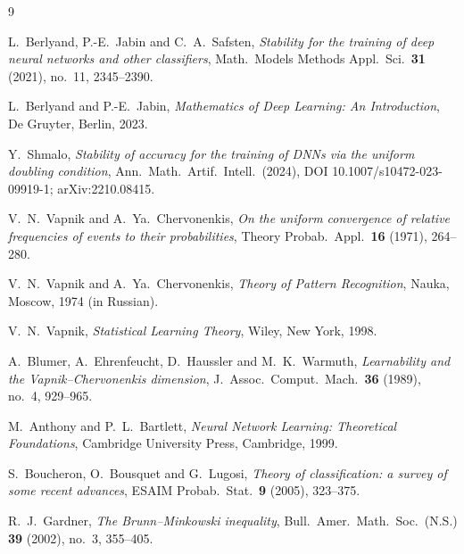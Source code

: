 \documentclass[11pt]{article}
\begin{document}
\begin{thebibliography}{9}

L.~Berlyand, P.-E.~Jabin and C.~A.~Safsten,
\emph{Stability for the training of deep neural networks and other classifiers},
Math.\ Models Methods Appl.\ Sci.\ \textbf{31} (2021), no.~11, 2345--2390.

L.~Berlyand and P.-E.~Jabin,
\emph{Mathematics of Deep Learning: An Introduction},
De Gruyter, Berlin, 2023.

Y.~Shmalo,
\emph{Stability of accuracy for the training of DNNs via the uniform doubling
condition},
Ann.\ Math.\ Artif.\ Intell.\ (2024), DOI 10.1007/s10472-023-09919-1;
arXiv:2210.08415.

V.~N.~Vapnik and A.~Ya.~Chervonenkis,
\emph{On the uniform convergence of relative frequencies of events to their
probabilities},
Theory Probab.\ Appl.\ \textbf{16} (1971), 264--280.

V.~N.~Vapnik and A.~Ya.~Chervonenkis,
\emph{Theory of Pattern Recognition},
Nauka, Moscow, 1974 (in Russian).

V.~N.~Vapnik,
\emph{Statistical Learning Theory},
Wiley, New York, 1998.

A.~Blumer, A.~Ehrenfeucht, D.~Haussler and M.~K.~Warmuth,
\emph{Learnability and the Vapnik--Chervonenkis dimension},
J.\ Assoc.\ Comput.\ Mach.\ \textbf{36} (1989), no.~4, 929--965.

M.~Anthony and P.~L.~Bartlett,
\emph{Neural Network Learning: Theoretical Foundations},
Cambridge University Press, Cambridge, 1999.

S.~Boucheron, O.~Bousquet and G.~Lugosi,
\emph{Theory of classification: a survey of some recent advances},
ESAIM Probab.\ Stat.\ \textbf{9} (2005), 323--375.

R.~J.~Gardner,
\emph{The Brunn--Minkowski inequality},
Bull.\ Amer.\ Math.\ Soc.\ (N.S.) \textbf{39} (2002), no.~3, 355--405.

\end{thebibliography}
\end{document}
